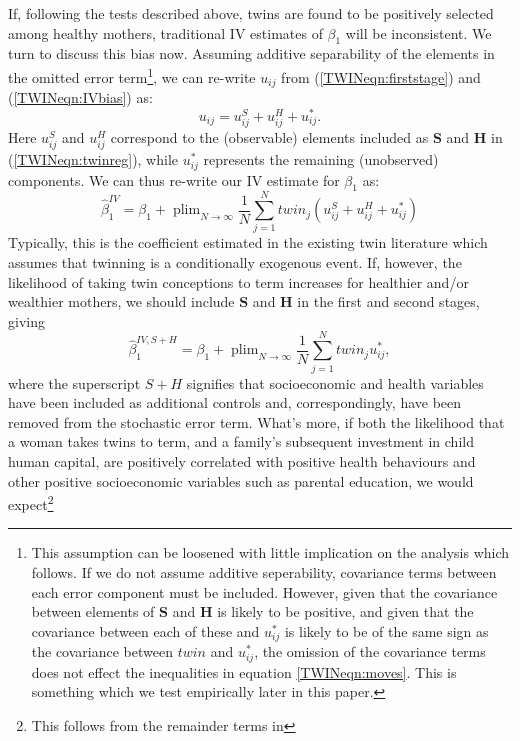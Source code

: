\documentclass[subeqn]{article}
\DeclareMathOperator{\plim}{plim}
\begin{document}
\begin{spacing}{1.4}
If, following the tests described above, twins are found to be positively selected
among healthy mothers, traditional IV estimates of $\beta_1$ will be inconsistent.
We turn to discuss this bias now.
Assuming additive separability of the elements in the omitted error term\footnote{%
This assumption can be loosened with little implication on the analysis which
follows.  If we do not assume additive seperability, covariance terms between each
error component must be included.  However, given that the covariance between 
elements of $\bm{S}$ and $\bm{H}$ is likely to be positive, and given that the 
covariance between each of these and $u^*_{ij}$ is likely to be of the same sign
as the covariance between $twin$ and $u^*_{ij}$, the omission of the covariance
terms does not effect the inequalities in equation \ref{TWINeqn:moves}.  This is
something which we test empirically later in this paper.}, we can 
re-write $u_{ij}$ from (\ref{TWINeqn:firststage}) and (\ref{TWINeqn:IVbias}) as:
\[ u_{ij}=u^S_{ij}+u^H_{ij}+u^*_{ij}. \]
Here $u^S_{ij}$ and $u^H_{ij}$ correspond to the (observable) elements included 
as $\bm{S}$ and $\bm{H}$ in (\ref{TWINeqn:twinreg}), while $u^*_{ij}$ represents 
the remaining (unobserved) components.  We can thus re-write our IV estimate for 
$\beta_1$ as:
\begin{equation}
\label{TWINeqn:betabias}
\hat\beta_1^{IV} = \beta_1 + 
\plim_{N\to \infty} \frac{1}{N}\sum_{j=1}^N twin_j(u^S_{ij}+u^H_{ij}+u^*_{ij})
\end{equation}
Typically, this is the coefficient estimated in the existing twin literature 
which assumes that twinning is a conditionally exogenous event.  If, however, the 
likelihood of taking twin conceptions to term increases for healthier and/or 
wealthier mothers, we should include $\bm{S}$ and $\bm{H}$ in the first and 
second stages, giving
\begin{equation}
\label{TWINeqn:betacloser}
\hat\beta_1^{IV,S+H} = \beta_1 +
\plim_{N\to \infty} \frac{1}{N}\sum_{j=1}^N twin_ju^*_{ij},
\end{equation}
where the superscript $S+H$ signifies that socioeconomic and health variables 
have been included as additional controls and, correspondingly, have been 
removed from the stochastic error term.  What's more, if both the likelihood
that a woman takes twins to term, and a family's subsequent investment in child 
human capital, are positively correlated with positive health behaviours and 
other positive socioeconomic variables such as parental education, we would 
expect\footnote{This follows from the remainder terms in 
}
\end{spacing}
\end{document}
